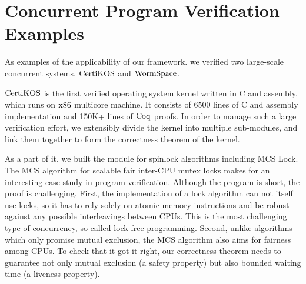 \section{Concurrent Program Verification Examples}
\label{chapter:introduction:sec:concurrent-program-verification-examples}


As examples of the applicability of our framework. 
we verified two large-scale concurrent systems, $\mathrm{CertiKOS}$ and $\mathrm{WormSpace}$.

$\mathrm{CertiKOS}$ is the first verified operating system kernel written in C and assembly,
which runs on $\mathrm{x86}$ multicore machine. 
It consists of 6500 lines of C and
assembly implementation and 150K+ lines of $\mathrm{Coq}$ proofs.
In order to manage such a large verification effort, 
we extensibly divide the kernel 
into multiple sub-modules, 
and link them together 
to form the correctness theorem of the kernel. 

As a part of it, 
we built 
the module for spinlock algorithms including MCS Lock. 
The MCS algorithm for scalable fair inter-CPU mutex locks makes for an interesting case study in program verification.
Although the program is short, the proof is challenging.
First, the implementation of a lock algorithm can not itself use locks, so it has to rely solely on atomic memory instructions and be robust against any possible interleavings between CPUs. This is the most challenging type of concurrency, so-called lock-free programming.
Second, unlike algorithms which only promise mutual exclusion, the MCS algorithm also aims for fairness among CPUs. To check that it got it right, our correctness theorem needs to guarantee not only mutual exclusion (a safety property) but also bounded waiting time (a liveness property).



%
%

